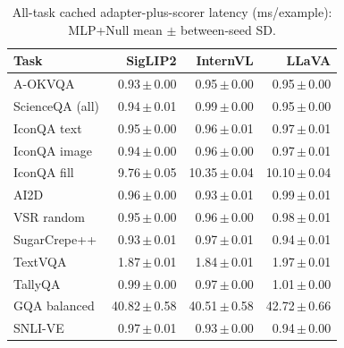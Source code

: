 \begin{table}[t]
\centering\small
\setlength{\tabcolsep}{3pt}\renewcommand{\arraystretch}{1.10}
\caption{All-task cached adapter-plus-scorer latency (ms/example): MLP+Null mean $\pm$ between-seed SD.}
\label{tab:latency-all}
\begin{tabular}{@{}lrrr@{}}
\toprule
Task & SigLIP2 & InternVL & LLaVA \\
\midrule
A-OKVQA & 0.93\,$\pm$\,0.00 & 0.95\,$\pm$\,0.00 & 0.95\,$\pm$\,0.00 \\
ScienceQA (all) & 0.94\,$\pm$\,0.01 & 0.99\,$\pm$\,0.00 & 0.95\,$\pm$\,0.00 \\
IconQA text & 0.95\,$\pm$\,0.00 & 0.96\,$\pm$\,0.01 & 0.97\,$\pm$\,0.01 \\
IconQA image & 0.94\,$\pm$\,0.00 & 0.96\,$\pm$\,0.00 & 0.97\,$\pm$\,0.01 \\
IconQA fill & 9.76\,$\pm$\,0.05 & 10.35\,$\pm$\,0.04 & 10.10\,$\pm$\,0.04 \\
AI2D & 0.96\,$\pm$\,0.00 & 0.93\,$\pm$\,0.01 & 0.99\,$\pm$\,0.01 \\
VSR random & 0.95\,$\pm$\,0.00 & 0.96\,$\pm$\,0.00 & 0.98\,$\pm$\,0.01 \\
SugarCrepe++ & 0.93\,$\pm$\,0.01 & 0.97\,$\pm$\,0.01 & 0.94\,$\pm$\,0.01 \\
TextVQA & 1.87\,$\pm$\,0.01 & 1.84\,$\pm$\,0.01 & 1.97\,$\pm$\,0.01 \\
TallyQA & 0.99\,$\pm$\,0.00 & 0.97\,$\pm$\,0.00 & 1.01\,$\pm$\,0.00 \\
GQA balanced & 40.82\,$\pm$\,0.58 & 40.51\,$\pm$\,0.58 & 42.72\,$\pm$\,0.66 \\
SNLI-VE & 0.97\,$\pm$\,0.01 & 0.93\,$\pm$\,0.00 & 0.94\,$\pm$\,0.00 \\
\bottomrule
\end{tabular}
\end{table}
